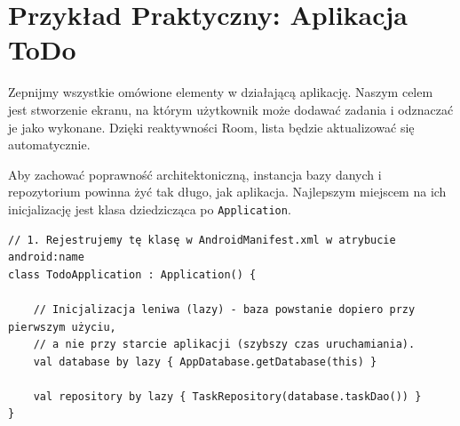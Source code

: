 \section{Przykład Praktyczny: Aplikacja ToDo}

Zepnijmy wszystkie omówione elementy w działającą aplikację. Naszym celem jest stworzenie ekranu, na którym użytkownik może dodawać zadania i odznaczać je jako wykonane. Dzięki reaktywności Room, lista będzie aktualizować się automatycznie.

Aby zachować poprawność architektoniczną, instancja bazy danych i repozytorium powinna żyć tak długo, jak aplikacja. Najlepszym miejscem na ich inicjalizację jest klasa dziedzicząca po \texttt{Application}.

\begin{verbatim}
// 1. Rejestrujemy tę klasę w AndroidManifest.xml w atrybucie android:name
class TodoApplication : Application() {
    
    // Inicjalizacja leniwa (lazy) - baza powstanie dopiero przy pierwszym użyciu,
    // a nie przy starcie aplikacji (szybszy czas uruchamiania).
    val database by lazy { AppDatabase.getDatabase(this) }
    
    val repository by lazy { TaskRepository(database.taskDao()) }
}
\end{verbatim}

